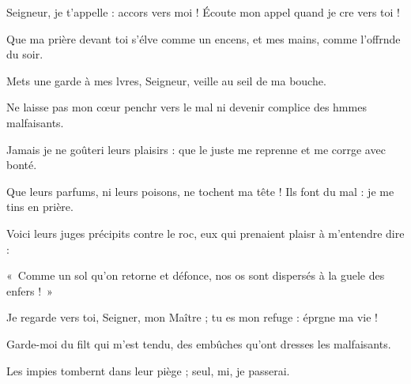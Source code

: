\item Seigneur, je t’appelle : accors vers moi !\psstar{} Écoute mon appel quand je cre vers toi !
\item Que ma prière devant toi s’élve comme un encens,\psstar{} et mes mains, comme l’offrnde du soir.
\item Mets une garde à mes lvres, Seigneur,\psstar{} veille au seil de ma bouche.
\item Ne laisse pas mon cœur penchr vers le mal\psstar{} ni devenir complice des hmmes malfaisants.
\item Jamais je ne goûteri leurs plaisirs : que le juste me reprenne et me corrge avec bonté.
\item Que leurs parfums, ni leurs poisons, ne tochent ma tête !\psstar{} Ils font du mal : je me tins en prière.
\item Voici leurs juges précipits contre le roc,\psstar{} eux qui prenaient plaisr à m’entendre dire :
\item « Comme un sol qu’on retorne et défonce,\psstar{} nos os sont dispersés à la guele des enfers ! »
\item Je regarde vers toi, Seigner, mon Maître ;\psstar{} tu es mon refuge : éprgne ma vie !
\item Garde-moi du filt qui m’est tendu,\psstar{} des embûches qu’ont dresses les malfaisants.
\item Les impies tombernt dans leur piège ;\psstar{} seul, mi, je passerai.
